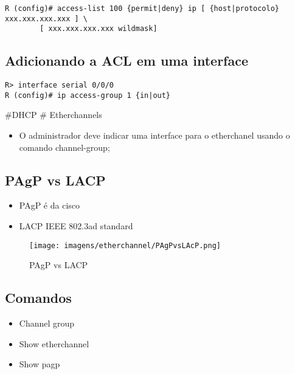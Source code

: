 \documentclass[]{article}
\providecommand{\tightlist}{%
  \setlength{\itemsep}{0pt}\setlength{\parskip}{0pt}}
\begin{document}
\begin{verbatim}
R (config)# access-list 100 {permit|deny} ip [ {host|protocolo} xxx.xxx.xxx.xxx ] \
        [ xxx.xxx.xxx.xxx wildmask]
\end{verbatim}

\hypertarget{adicionando-a-acl-em-uma-interface}{%
\subsection{Adicionando a ACL em uma
interface}\label{adicionando-a-acl-em-uma-interface}}

\begin{verbatim}
R> interface serial 0/0/0
R (config)# ip access-group 1 {in|out}
\end{verbatim}

\#DHCP \# Etherchannels

\begin{itemize}
\tightlist
\item
  O administrador deve indicar uma interface para o etherchanel usando o
  comando channel-group;
\end{itemize}

\hypertarget{pagp-vs-lacp}{%
\subsection{PAgP vs LACP}\label{pagp-vs-lacp}}

\begin{itemize}
\item
  PAgP é da cisco
\item
  LACP IEEE 802.3ad standard
\end{itemize}

\begin{figure}
\centering
\texttt{[image: imagens/etherchannel/PAgPvsLAcP.png]}
\caption{PAgP vs LACP}
\end{figure}

\hypertarget{comandos}{%
\subsection{Comandos}\label{comandos}}

\begin{itemize}
\item
  Channel group
\item
  Show etherchannel
\item
  Show pagp
\end{itemize}
\end{document}
